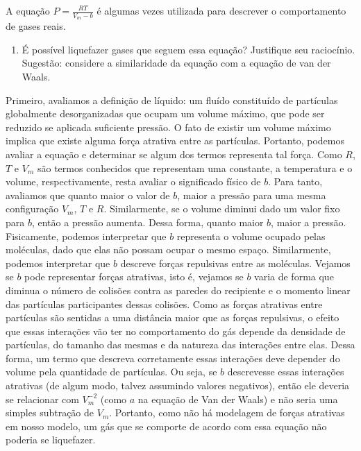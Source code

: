 \begin{xcs}
    A equação \( P = \frac{RT}{V_m - b} \) é algumas vezes utilizada para
    descrever o comportamento de gases reais. 
    \begin{enumerate}[label=\alph*.]
        \item É possível liquefazer gases que seguem essa equação? Justifique
            seu raciocínio. Sugestão: considere a similaridade da equação com a
            equação de van der Waals. 
    \end{enumerate}
\end{xcs}
\begin{rsl}
    Primeiro, avaliamos a definição de líquido: um fluído constituído de
    partículas globalmente desorganizadas que ocupam um volume máximo, que pode
    ser reduzido se aplicada suficiente pressão. O fato de existir um volume
    máximo implica que existe alguma força atrativa entre as partículas.
    Portanto, podemos avaliar a equação e determinar se algum dos termos
    representa tal força.  Como $R$, $T$ e $V_m$ são termos conhecidos que
    representam uma constante, a temperatura e o volume, respectivamente, resta
    avaliar o significado físico de $b$. Para tanto, avaliamos que quanto maior
    o valor de $b$, maior a pressão para uma mesma configuração $V_m$, $T$ e
    $R$. Similarmente, se o volume diminui dado um valor fixo para $b$, então a
    pressão aumenta. Dessa forma, quanto maior $b$, maior a pressão.
    Fisicamente, podemos interpretar que $b$ representa o volume ocupado pelas
    moléculas, dado que elas não possam ocupar o mesmo espaço. Similarmente,
    podemos interpretar que $b$ descreve forças repulsivas entre as moléculas.
    Vejamos se \( b \) pode representar forças atrativas, isto é, vejamos se \(
    b\) varia de forma que diminua o número de colisões contra as paredes do
    recipiente e o momento linear das partículas participantes dessas colisões.
    Como as forças atrativas entre partículas são sentidas a uma
    distância maior que as forças repulsivas, o efeito que essas interações vão
    ter no comportamento do gás depende da densidade de partículas, do tamanho
    das mesmas e da natureza das interações entre elas. Dessa forma, um termo
    que descreva corretamente essas interações deve depender do volume pela
    quantidade de partículas. Ou seja, se \( b \) descrevesse essas interações
    atrativas (de algum modo, talvez assumindo valores negativos),
    então ele deveria se relacionar com \(
    V_m^{-2}\) (como \( a \) na equação de Van der Waals)  e não seria uma
    simples subtração de \( V_m \).
    Portanto, como não há modelagem de forças atrativas em nosso modelo, um gás 
    que se comporte de acordo com essa equação não poderia se liquefazer.      

\end{rsl}
